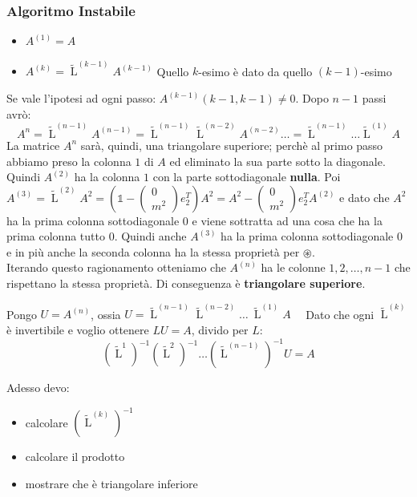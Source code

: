\documentclass{article}
\begin{document}
\subsubsection{Algoritmo Instabile}
\begin{itemize}
    \item[] $A^{(1)}=A$
    \item[] $A^{(k)}=\widetilde{\operatorname{L}}^{(k-1)}A^{(k-1)}$ Quello $k$-esimo è dato da quello $(k-1)$-esimo
\end{itemize}
Se vale l'ipotesi ad ogni passo: $\boxed{A^{(k-1)}(k-1,k-1)\ne0}$. Dopo $n-1$ passi avrò:
\[A^n=\widetilde{\operatorname{L}}^{(n-1)}A^{(n-1)}=\widetilde{\operatorname{L}}^{(n-1)}\widetilde{\operatorname{L}}^{(n-2)}A^{(n-2)}\dots=\widetilde{\operatorname{L}}^{(n-1)}\dots\widetilde{\operatorname{L}}^{(1)}A\]
La matrice $A^n$ sarà, quindi, una triangolare superiore; perchè al primo passo abbiamo preso la colonna $1$ di $A$ ed eliminato
la sua parte sotto la diagonale. Quindi $A^{(2)}$ ha la colonna $1$ con la parte sottodiagonale \textbf{nulla}.
Poi $A^{(3)}=\widetilde{\operatorname{L}}^{(2)}A^2=\left(\mathbb 1-\begin{pmatrix}
            0 \\
            m^2
        \end{pmatrix}e_2^T\right)A^2=A^2-\begin{pmatrix}
        0 \\
        m^2
    \end{pmatrix}e^T_2A^{(2)}$ e dato che $A^2$ ha la prima colonna sottodiagonale $0$ e viene sottratta ad una cosa che ha la prima colonna tutto $0$.
Quindi anche $A^{(3)}$ ha la prima colonna sottodiagonale $0$ e in più anche la seconda colonna ha la stessa proprietà per $\circledast$.\\
Iterando questo ragionamento otteniamo che $A^{(n)}$ ha le colonne $1,2,\dots,n-1$ che rispettano la stessa proprietà. Di conseguenza è \textbf{triangolare superiore}.

Pongo $U=A^{(n)}$, ossia $U=\widetilde{\operatorname{L}}^{(n-1)}\widetilde{\operatorname{L}}^{(n-2)}\dots\ \widetilde{\operatorname{L}}^{(1)}A\quad$ Dato che ogni $\widetilde{\operatorname{L}}^{(k)}$ è invertibile e voglio ottenere $LU=A$, divido per $L$:
\[\left(\widetilde{\operatorname{L}}^1\right)^{-1}\left(\widetilde{\operatorname{L}}^2\right)^{-1}\dots\left(\widetilde{\operatorname{L}}^{(n-1)}\right)^{-1}U=A\]

Adesso devo:
\begin{itemize}
    \item calcolare $\left(\widetilde{\operatorname{L}}^{(k)}\right)^{-1}$
    \item calcolare il prodotto
    \item mostrare che è triangolare inferiore
\end{itemize}
\end{document}
